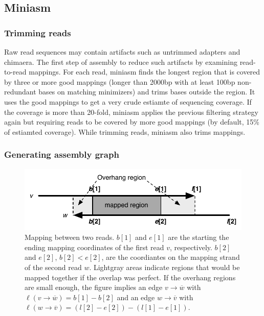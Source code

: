 \documentclass{bioinfo}
\begin{document}
\begin{methods}
\subsection{Miniasm}

\subsubsection{Trimming reads}

Raw read sequences may contain artifacts such as untrimmed adapters and
chimaera. The first step of assembly to reduce such artifacts by examining
read-to-read mappings. For each read, miniasm finds the longest region that is
covered by three or more good mappings (longer than 2000bp with at least 100bp
non-redundant bases on matching minimizers) and trims bases outside the region.
It uses the good mappings to get a very crude estiamte of sequencing coverage.
If the coverage is more than 20-fold, miniasm applies the previous filtering
strategy again but requiring reads to be covered by more good mappings (by
default, 15\% of estiamted coverage). While trimming reads, miniasm also trims
mappings.

\subsubsection{Generating assembly graph}

\begin{figure}[ht]
\centering
\includegraphics[width=.45\textwidth]{overhang}
\caption{Mapping between two reads. $b[1]$ and $e[1]$ are the starting the
ending mapping coordinates of the first read $v$, respectively. $b[2]$ and
$e[2]$, $b[2]<e[2]$, are the coordiantes on the mapping strand of the second
read $w$. Lightgray areas indicate regions that would be mapped together if the
overlap was perfect. If the overhang regions are small enough, the figure
implies an edge $v\to\overline{w}$ with $\ell(v\to\overline{w})=b[1]-b[2]$ and
an edge $w\to\overline{v}$ with
$\ell(w\to\overline{v})=(l[2]-e[2])-(l[1]-e[1])$.}\label{fig:overhang}
\end{figure}


\end{methods}
\end{document}
